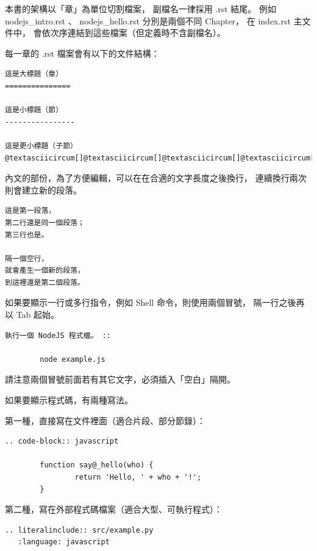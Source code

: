 \documentclass[a4paper,12pt,english]{sphinxmanual}
\begin{document}
本書的架構以「章」為單位切割檔案，
副檔名一律採用 .rst 結尾。
例如 nodejs\_intro.rst 、 nodejs\_hello.rst 分別是兩個不同 Chapter，
在 index.rst 主文件中，
會依次序連結到這些檔案（但定義時不含副檔名）。

每一章的 .rst 檔案會有以下的文件結構：

\begin{Verbatim}[commandchars=@\[\]]
這是大標題（章）
===============

這是小標題（節）
----------------

這是更小標題（子節）
@textasciicircum[]@textasciicircum[]@textasciicircum[]@textasciicircum[]@textasciicircum[]@textasciicircum[]@textasciicircum[]@textasciicircum[]@textasciicircum[]@textasciicircum[]@textasciicircum[]@textasciicircum[]@textasciicircum[]@textasciicircum[]@textasciicircum[]@textasciicircum[]@textasciicircum[]@textasciicircum[]@textasciicircum[]@textasciicircum[]
\end{Verbatim}

內文的部份，為了方便編輯，可以在在合適的文字長度之後換行，
連續換行兩次則會建立新的段落。

\begin{Verbatim}[commandchars=@\[\]]
這是第一段落，
第二行還是同一個段落；
第三行也是。

隔一個空行，
就會產生一個新的段落，
到這裡還是第二個段落。
\end{Verbatim}

如果要顯示一行或多行指令，例如 Shell 命令，則使用兩個冒號，
隔一行之後再以 Tab 起始。

\begin{Verbatim}[commandchars=@\[\]]
執行一個 NodeJS 程式檔。 ::

        node example.js
\end{Verbatim}

請注意兩個冒號前面若有其它文字，必須插入「空白」隔開。

如果要顯示程式碼，有兩種寫法。

第一種，直接寫在文件裡面（適合片段、部分節錄）：

\begin{Verbatim}[commandchars=@\[\]]
.. code-block:: javascript

        function say@_hello(who) {
                return 'Hello, ' + who + '!';
        }
\end{Verbatim}

第二種，寫在外部程式碼檔案（適合大型、可執行程式）：

\begin{Verbatim}[commandchars=@\[\]]
.. literalinclude:: src/example.py
   :language: javascript
\end{Verbatim}
\end{document}
